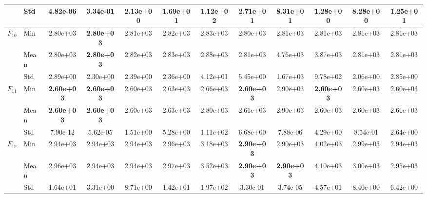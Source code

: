 \begin{center}
\begin{longtable}{clcccccccccc}
 & Std & 4.82e-06 & 3.34e-01 & 2.13e+00 & 1.69e+01 & 1.12e+02 & 2.71e+01 & 8.31e+01 & 1.28e+00 & 8.28e+00 & 1.25e+01 \\
\midrule
\multirow{3}{*}{$F_{10}$} & Min & 2.80e+03 & \textbf{2.80e+03} & 2.81e+03 & 2.82e+03 & 2.83e+03 & 2.80e+03 & 2.81e+03 & 2.81e+03 & 2.81e+03 & 2.81e+03 \\
 & Mean & 2.80e+03 & \textbf{2.80e+03} & 2.82e+03 & 2.83e+03 & 2.88e+03 & 2.81e+03 & 4.76e+03 & 3.87e+03 & 2.81e+03 & 2.81e+03 \\
 & Std & 2.89e+00 & 2.30e+00 & 2.39e+00 & 2.36e+00 & 4.12e+01 & 5.45e+00 & 1.67e+03 & 9.78e+02 & 2.06e+00 & 2.85e+00 \\
\midrule
\multirow{3}{*}{$F_{11}$} & Min & \textbf{2.60e+03} & \textbf{2.60e+03} & 2.60e+03 & 2.63e+03 & 2.66e+03 & \textbf{2.60e+03} & 2.90e+03 & \textbf{2.60e+03} & 2.60e+03 & 2.60e+03 \\
 & Mean & \textbf{2.60e+03} & \textbf{2.60e+03} & 2.60e+03 & 2.63e+03 & 2.80e+03 & 2.61e+03 & 2.90e+03 & 2.60e+03 & 2.60e+03 & 2.61e+03 \\
 & Std & 7.90e-12 & 5.62e-05 & 1.51e+00 & 5.28e+00 & 1.11e+02 & 6.68e+00 & 7.88e-06 & 4.29e+00 & 8.54e-01 & 2.64e+00 \\
\midrule
\multirow{3}{*}{$F_{12}$} & Min & 2.94e+03 & 2.94e+03 & 2.94e+03 & 2.96e+03 & 3.18e+03 & \textbf{2.90e+03} & 2.90e+03 & 4.02e+03 & 2.99e+03 & 2.94e+03 \\
 & Mean & 2.96e+03 & 2.94e+03 & 2.94e+03 & 2.97e+03 & 3.52e+03 & \textbf{2.90e+03} & \textbf{2.90e+03} & 4.10e+03 & 3.00e+03 & 2.95e+03 \\
 & Std & 1.64e+01 & 3.31e+00 & 8.71e+00 & 1.42e+01 & 1.97e+02 & 3.30e-01 & 3.74e-05 & 4.57e+01 & 8.40e+00 & 6.42e+00 \\
\bottomrule
\end{longtable}
\end{center}